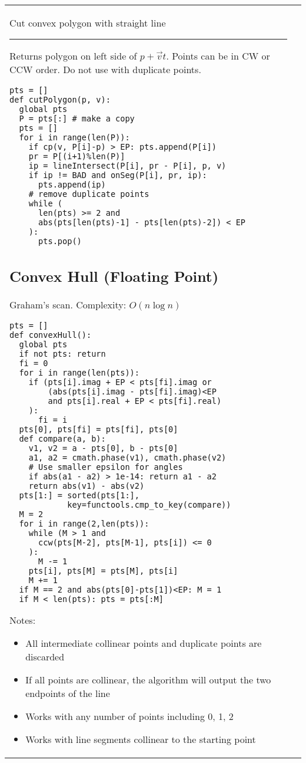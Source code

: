 \documentclass[letterpaper]{article}
\newcommand{\rx}[1]{#1\hrule}
\begin{document}
\clearpage

\begin{tabular}{@{}p{9cm}p{9cm}@{}}
    \rx{Cut convex polygon with straight line}
    \vspace{1mm}
    Returns polygon on left side of $p+\vec vt$. Points can be in CW or CCW order. Do not use with duplicate points.
    \begin{lstlisting}
pts = []
def cutPolygon(p, v):
  global pts
  P = pts[:] # make a copy
  pts = []
  for i in range(len(P)):
    if cp(v, P[i]-p) > EP: pts.append(P[i])
    pr = P[(i+1)%len(P)]
    ip = lineIntersect(P[i], pr - P[i], p, v)
    if ip != BAD and onSeg(P[i], pr, ip):
      pts.append(ip)
    # remove duplicate points
    while (
      len(pts) >= 2 and
      abs(pts[len(pts)-1] - pts[len(pts)-2]) < EP
    ):
      pts.pop()
\end{lstlisting}

    \subsection{Convex Hull (Floating Point)}
    Graham's scan. Complexity: $O\left(n\log n\right)$

    \begin{lstlisting}
pts = []
def convexHull():
  global pts
  if not pts: return
  fi = 0
  for i in range(len(pts)):
    if (pts[i].imag + EP < pts[fi].imag or
        (abs(pts[i].imag - pts[fi].imag)<EP
        and pts[i].real + EP < pts[fi].real)
    ):
      fi = i
  pts[0], pts[fi] = pts[fi], pts[0]
  def compare(a, b):
    v1, v2 = a - pts[0], b - pts[0]
    a1, a2 = cmath.phase(v1), cmath.phase(v2)
    # Use smaller epsilon for angles
    if abs(a1 - a2) > 1e-14: return a1 - a2
    return abs(v1) - abs(v2)
  pts[1:] = sorted(pts[1:],
            key=functools.cmp_to_key(compare))
  M = 2
  for i in range(2,len(pts)):
    while (M > 1 and
      ccw(pts[M-2], pts[M-1], pts[i]) <= 0
    ):
      M -= 1
    pts[i], pts[M] = pts[M], pts[i]
    M += 1
  if M == 2 and abs(pts[0]-pts[1])<EP: M = 1
  if M < len(pts): pts = pts[:M]
\end{lstlisting}

    Notes:
    \begin{itemize}
        \item All intermediate collinear points and duplicate points are discarded
        \item If all points are collinear, the algorithm will output the two endpoints of the line
        \item Works with any number of points including 0, 1, 2
        \item Works with line segments collinear to the starting point
    \end{itemize}


\end{tabular}
\end{document}
